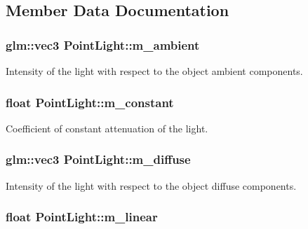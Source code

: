 \subsection{Member Data Documentation}
\hypertarget{classPointLight_a24fea5d1cc566b9a5266e3fc2df56f22}{
\subsubsection[{m\+\_\+ambient}]{\setlength{\rightskip}{0pt plus 5cm}glm\+::vec3 Point\+Light\+::m\+\_\+ambient\hspace{0.3cm}{\ttfamily [private]}}}\label{classPointLight_a24fea5d1cc566b9a5266e3fc2df56f22}
Intensity of the light with respect to the object ambient components. \hypertarget{classPointLight_a404f6e39448eaa92dbdbec6183062147}{
\subsubsection[{m\+\_\+constant}]{\setlength{\rightskip}{0pt plus 5cm}float Point\+Light\+::m\+\_\+constant\hspace{0.3cm}{\ttfamily [private]}}}\label{classPointLight_a404f6e39448eaa92dbdbec6183062147}
Coefficient of constant attenuation of the light. \hypertarget{classPointLight_a3e055011470b6dc9000f57fde449b8e2}{
\subsubsection[{m\+\_\+diffuse}]{\setlength{\rightskip}{0pt plus 5cm}glm\+::vec3 Point\+Light\+::m\+\_\+diffuse\hspace{0.3cm}{\ttfamily [private]}}}\label{classPointLight_a3e055011470b6dc9000f57fde449b8e2}
Intensity of the light with respect to the object diffuse components. \hypertarget{classPointLight_aaaf19c31763c3614e3edcd1eef322e96}{
\subsubsection[{m\+\_\+linear}]{\setlength{\rightskip}{0pt plus 5cm}float Point\+Light\+::m\+\_\+linear\hspace{0.3cm}{\ttfamily [private]}}}\label{classPointLight_aaaf19c31763c3614e3edcd1eef322e96}
